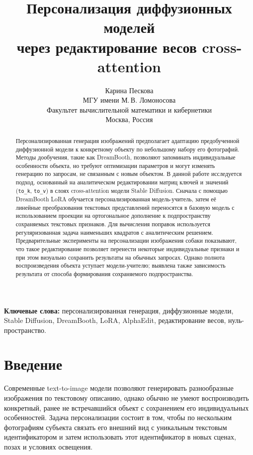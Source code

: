 \documentclass{article}
\title{Персонализация диффузионных моделей\\через редактирование весов cross-attention}
\author{
  Карина Пескова\\
  МГУ имени М.\,В. Ломоносова\\
  Факультет вычислительной математики и кибернетики\\
  Москва, Россия
}
\begin{document}
\maketitle

\begin{abstract}
Персонализированная генерация изображений предполагает адаптацию предобученной
диффузионной модели к конкретному объекту по небольшому набору его фотографий.
Методы дообучения, такие как DreamBooth, позволяют запоминать индивидуальные
особенности объекта, но требуют оптимизации параметров и могут изменять
генерацию по запросам, не связанным с новым объектом.
В данной работе исследуется подход, основанный на аналитическом редактировании
матриц ключей и значений (\texttt{to\_k}, \texttt{to\_v}) в слоях
cross-attention модели Stable Diffusion.
Сначала с помощью DreamBooth LoRA обучается персонализированная модель-учитель,
затем её линейные преобразования текстовых представлений переносятся в базовую
модель с использованием проекции на ортогональное дополнение к подпространству
сохраняемых текстовых признаков. Для вычисления поправок используется
регуляризованная задача наименьших квадратов с аналитическим решением.
Предварительные эксперименты на персонализации изображения собаки показывают,
что такое редактирование позволяет перенести некоторые индивидуальные признаки
и при этом визуально сохранить результаты на обычных запросах. Однако
полнота воспроизведения объекта уступает модели-учителю; выявлена также
зависимость результата от способа формирования сохраняемого подпространства.
\end{abstract}

\textbf{Ключевые слова:} персонализированная генерация,
диффузионные модели, Stable Diffusion, DreamBooth, LoRA, AlphaEdit,
редактирование весов, нуль-пространство.

\section{Введение}\label{sec:intro}

Современные text-to-image модели позволяют генерировать разнообразные изображения
по текстовому описанию, однако обычно не умеют воспроизводить конкретный,
ранее не встречавшийся объект с сохранением его индивидуальных особенностей.
Задача персонализации состоит в том, чтобы по нескольким фотографиям субъекта
связать его внешний вид с уникальным текстовым идентификатором и затем
использовать этот идентификатор в новых сценах, позах и условиях освещения.
\end{document}
